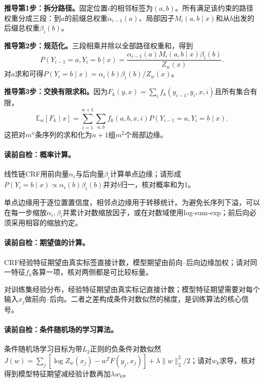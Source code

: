 \textbf{推导第1步：拆分路径。}固定位置$i$的相邻标签为$(a,b)$。所有满足该约束的路径权重分成三段：到$a$的前缀总权重$\alpha_{i-1}(a)$、局部因子$M_i(a,b\mid x)$和从$b$出发的后缀总权重$\beta_i(b)$。

\textbf{推导第2步：规范化。}三段相乘并除以全部路径权重和，得到
\[
P(Y_{i-1}=a,Y_i=b\mid x)
=\frac{\alpha_{i-1}(a)M_i(a,b\mid x)\beta_i(b)}{Z_w(x)}.
\]
对$a$求和可得$P(Y_i=b\mid x)=\alpha_i(b)\beta_i(b)/Z_w(x)$。

\textbf{推导第3步：交换有限求和。}因为$F_k(y,x)=\sum_if_k(y_{i-1},y_i,x,i)$且所有集合有限，
\[
\mathbb E_w[F_k\mid x]
=\sum_{i=1}^{n+1}\sum_{a,b}
f_k(a,b,x,i)
P(Y_{i-1}=a,Y_i=b\mid x).
\]
这把对$m^n$条序列的求和化为$n+1$组$m^2$个局部边缘。

\paragraph{读前自检：概率计算。}线性链CRF用前向量$\alpha_i$与后向量$\beta_i$计算单点边缘；请形成$P(Y_i=b\mid x)\propto\alpha_i(b)\beta_i(b)$并对$b$归一，核对概率和为1。\par

单点边缘用于逐位置置信度，相邻点边缘用于转移统计。为避免长序列下溢，可以在每一步缩放$\alpha_i,\beta_i$并累计对数缩放因子，或在对数域使用log-sum-exp；前后向必须采用相容的缩放约定。

\paragraph{读前自检：期望值的计算。}CRF经验特征期望由真实标签直接计数，模型期望由前向--后向边缘加权；请对同一特征$f_k$各算一项，核对两侧都是可比较标量。\par

对训练集经验分布，经验特征期望由真实标记直接计数；模型特征期望需要对每个输入$x_j$做前向--后向。二者之差构成条件对数似然的梯度，是训练算法的核心信号。


\paragraph{读前自检：条件随机场的学习算法。}条件随机场学习目标为带$L_2$正则的负条件对数似然$J(w)=\sum_j[\log Z_w(x_j)-w^TF(y_j,x_j)]+\lambda\lVert w\rVert_2^2/2$；请对$w_k$求导，核对得到模型特征期望减经验计数再加$\lambda w_k$。\par

